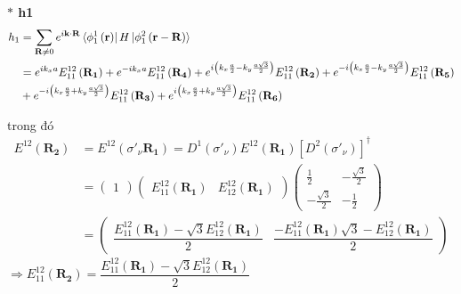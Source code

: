 \documentclass{article}
\begin{document}
\noindent \textbf{ $\ast$ h1}
\begin{align*}
	h_1 & = \sum_{\mathbf{R} \neq 0} e^{i\mathbf{k\cdot R}} \bra*{\phi_1^1 \left(\mathbf{r}\right)} H \ket*{\phi_1^2\left(\mathbf{r}-\mathbf{R}\right)}                                                                                                                                                                       \\
	    & = e^{i k_x a} E_{11}^{12}\left(\mathbf{R_1}\right) + e^{-i k_x a} E_{11}^{12}\left(\mathbf{R_4}\right) + e^{i \left( k_x \frac{a}{2} - k_y \frac{a\sqrt{3}}{2} \right)} E_{11}^{12}\left(\mathbf{R_2}\right) + e^{-i \left( k_x \frac{a}{2} - k_y \frac{a\sqrt{3}}{2} \right)} E_{11}^{12}\left(\mathbf{R_5}\right) \\
	    & + e^{-i \left( k_x \frac{a}{2} + k_y \frac{a\sqrt{3}}{2} \right)} E_{11}^{12}\left(\mathbf{R_3}\right) + e^{i \left( k_x \frac{a}{2} + k_y \frac{a\sqrt{3}}{2} \right)} E_{11}^{12}\left(\mathbf{R_6}\right)
\end{align*}

trong đó
\begin{align*}
	E^{12}(\mathbf{R_2})
	 & = E^{12}(\sigma'_\nu \mathbf{R_1}) = D^1(\sigma'_\nu) E^{12}(\mathbf{R_1}) \left[ D^2(\sigma'_\nu)\right]^\dagger                                                                                                                                                                                                 \\
	 & = \begin{pmatrix}
		     1
	     \end{pmatrix}
	\begin{pmatrix}
		E_{11}^{12}(\mathbf{R_1}) & E_{12}^{12}(\mathbf{R_1})
	\end{pmatrix}
	\begin{pmatrix}
		\frac{1}{2}         & -\frac{\sqrt{3}}{2} \\
		-\frac{\sqrt{3}}{2} & -\frac{1}{2}
	\end{pmatrix}                                                                                                                                                                                                                                                             \\
	 & = \begin{pmatrix}
		     \dfrac{ E_{11}^{12}(\mathbf{R_1}) - \sqrt{3} E_{12}^{12}(\mathbf{R_1})}{2} & \dfrac{ - E_{11}^{12}(\mathbf{R_1})\sqrt{3} -  E_{12}^{12}(\mathbf{R_1})}{2}
	     \end{pmatrix}
\end{align*}
$\Rightarrow E_{11}^{12}(\mathbf{R_2}) =  \dfrac{ E_{11}^{12}(\mathbf{R_1}) - \sqrt{3} E_{12}^{12}(\mathbf{R_1})}{2} $
\end{document}
